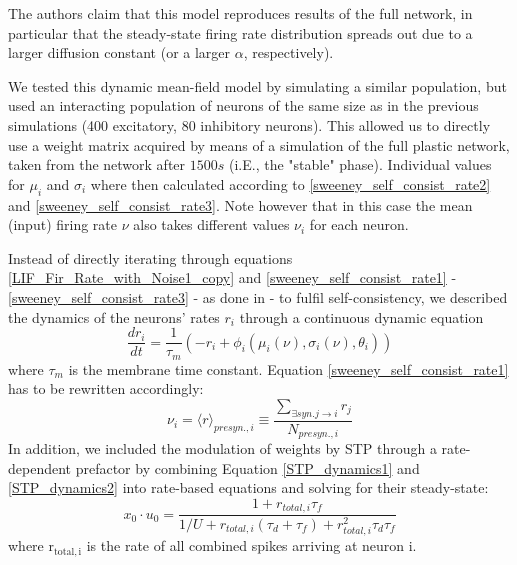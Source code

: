 \documentclass[10pt,a4paper]{article}
\begin{document}
The authors claim that this model reproduces results of the full network, in particular that the steady-state firing rate distribution spreads out due to a larger diffusion constant (or a larger $\alpha$, respectively).

We tested this dynamic mean-field model by simulating a similar population, but used an interacting population of neurons of the same size as in the previous simulations (400 excitatory, 80 inhibitory neurons). This allowed us to directly use a weight matrix acquired by means of a simulation of the full plastic network, taken from the network after $1500s$ (i.E., the "stable" phase).
Individual values for $\mu_i$ and $\sigma_i$ where then calculated according to \eqref{sweeney_self_consist_rate2} and \eqref{sweeney_self_consist_rate3}. Note however that in this case the mean (input) firing rate $\nu$ also takes different values $\nu_i$ for each neuron.

Instead of directly iterating through equations \eqref{LIF_Fir_Rate_with_Noise1_copy} and \eqref{sweeney_self_consist_rate1} - \eqref{sweeney_self_consist_rate3} - as done in \cite{Sweeney_Paper} - to fulfil self-consistency, we described the dynamics of the neurons' rates $r_i$ through a continuous dynamic equation
\begin{equation}
\frac{dr_i}{dt} = \frac{1}{\tau_m} \left( -r_i + \phi_i(\mu_i(\nu),\sigma_i(\nu),\theta_i) \right)
\label{dyn_rate_equation}
\end{equation}
where $\tau_m$ is the membrane time constant. Equation \eqref{sweeney_self_consist_rate1} has to be rewritten accordingly:
\begin{equation}
\nu_i = {\langle r \rangle}_{presyn.,i} \equiv \frac{\sum_{\exists syn. j\rightarrow i} r_j}{N_{presyn., i}}
\label{sweeney_self_consist_rate1_mod}
\end{equation}
In addition, we included the modulation of weights by STP through a rate-dependent prefactor by combining Equation \eqref{STP_dynamics1} and \eqref{STP_dynamics2} into rate-based equations and solving for their steady-state:
\begin{equation}
x_{0}\cdot u_{0} = \frac{1+r_{total,i} \tau_f}{1/U + r_{total,i} (\tau_d + \tau_f)+ r_{total,i}^2 \tau_d \tau_f}
\label{STP_steady}
\end{equation}
where $\mathrm{r_{total,i}}$ is the rate of all combined spikes arriving at neuron i.
\end{document}
